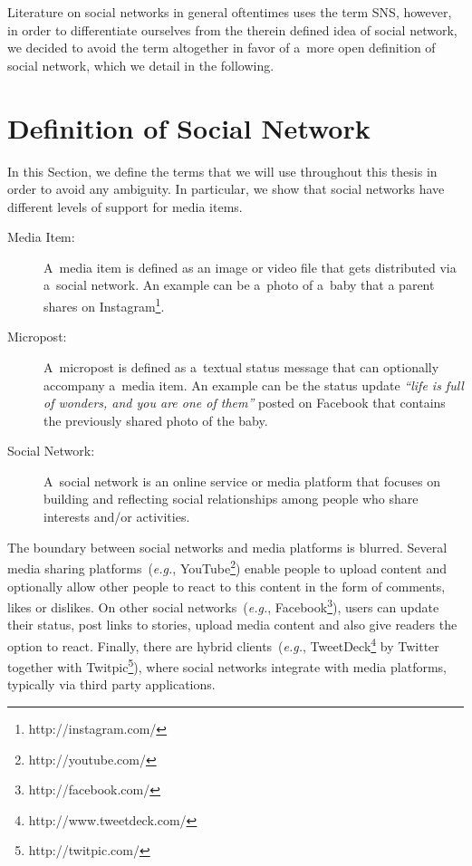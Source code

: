 Literature on social networks in general oftentimes uses the term SNS,
however, in order to differentiate ourselves from the therein defined idea of social network,
we decided to avoid the term altogether in favor of a~more open definition of social network,
which we detail in the following. 

\section{Definition of Social Network} \label{sec:definition}
In this Section, we define the terms that we will use throughout this thesis
in order to avoid any ambiguity.
In particular, we show that social networks have
different levels of support for media items.

\begin{description}
  \item[Media Item:] A~media item is defined as an image or video file
that gets distributed via a~social network.
An example can be a~photo of a~baby that
a parent shares on Instagram\footnote{http://instagram.com/}.

  \item[Micropost:]
A~micropost is defined as a~textual status message that can optionally accompany a~media item.
An example can be the status update
\emph{``life is full of wonders, and you are one of them''}
posted on Facebook that contains the previously shared photo of the baby.

  \item[Social Network:]
A~social network is an online service or media platform
that focuses on building and reflecting social relationships among
people who share interests and/or activities.
\end{description}

The boundary between social networks and media platforms is blurred.
Several media sharing platforms~(\emph{e.g.}, YouTube\footnote{http://youtube.com/})
enable people to upload content and optionally allow other people to react
to this content in the form of comments, likes or dislikes.
On other social networks~(\emph{e.g.}, Facebook\footnote{http://facebook.com/}),
users can update their status, post links to stories, upload media content
and also give readers the option to react.
Finally, there are hybrid clients~(\emph{e.g.}, TweetDeck\footnote{http://www.tweetdeck.com/}
by Twitter together with Twitpic\footnote{http://twitpic.com/}), where social networks integrate with media platforms, typically via third party applications.

